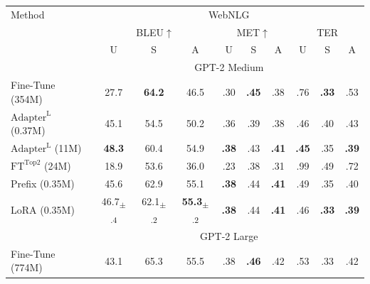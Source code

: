 \documentclass{article} %
\begin{document}
\begin{table}[h]
\centering
\begin{tabular}{l|ccc|ccc|ccc}
\hline
\toprule
Method & \multicolumn{9}{c}{WebNLG} \\ %
       & \multicolumn{3}{c}{BLEU$\uparrow$}  &  \multicolumn{3}{c}{MET$\uparrow$} & \multicolumn{3}{c}{TER } \\
       & U & S & A & U & S & A & U & S & A \\
\midrule
&  \multicolumn{9}{c}{GPT-2 Medium}\\
Fine-Tune (354M)                    & 27.7                                  & \textbf{64.2}                         & 46.5                                  & .30           & \textbf{.45}  & .38           &.76            & \textbf{.33}           & .53  \\
$\text{Adapter}^{\text{L}}$ (0.37M)  & 45.1                                  & 54.5                                  & 50.2                                  & .36           & .39           & .38           & .46           & .40           & .43 \\
$\text{Adapter}^{\text{L}}$ (11M)   & \textbf{48.3}                         & 60.4                                  & 54.9                                  & \textbf{.38}  & .43           & \textbf{.41}  & \textbf{.45}  & .35           &  \textbf{.39} \\
$\text{FT}^{\text{Top2}}$ (24M)     & 18.9                                  & 53.6                                  & 36.0                                  & .23           & .38           & .31           & .99          & .49           & .72 \\
Prefix (0.35M)                      & 45.6                                  & 62.9                                  & 55.1                                  & \textbf{.38}  & .44           & \textbf{.41}  & .49           & .35           & .40   \\
LoRA (0.35M)                        & 46.7\textsubscript{$\pm$.4}           & 62.1\textsubscript{$\pm$.2}           & \textbf{55.3}\textsubscript{$\pm$.2}  & \textbf{.38}  & .44           & \textbf{.41}  & .46           & \textbf{.33}  & \textbf{.39} \\
\midrule
& \multicolumn{9}{c}{GPT-2 Large}\\
Fine-Tune (774M)                    & 43.1                                  & 65.3                                  & 55.5                                  & .38           & \textbf{.46}  & .42           & .53           & .33           & .42  \\

\end{tabular}
\end{table}
\end{document}
